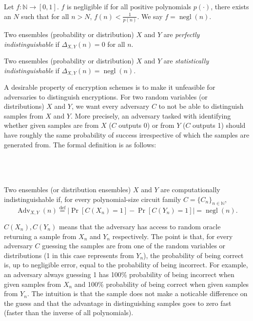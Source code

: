 \begin{definition}
    Let $f \colon \mathbb{N} \to [0,1]$. $f$ is negligible if for all positive polynomials $p(\cdot)$, there exists an $N$ such that for all $n>N$, $f(n) < \frac{1}{p(n)}$. We say $f = \operatorname{negl}(n)$.
\end{definition}
\begin{definition} \label{def:perfectly-indistinguishable}
    Two ensembles (probability or distribution) $X$ and $Y$ are \emph{perfectly indistinguishable} if $\Delta_{X,Y}(n) = 0$ for all $n$.
\end{definition}
\begin{definition} \label{def:statistically-indistinguishable}
    Two ensembles (probability or distribution) $X$ and $Y$ are \emph{statistically indistinguishable} if $\Delta_{X,Y}(n) = \operatorname{negl}(n)$.
\end{definition}
 A desirable property of encryption schemes is to make it unfeasible for adversaries to distinguish encryptions. For two random variables (or distributions) $X$ and $Y$, we want every adversary $C$ to not be able to distinguish samples from $X$ and $Y$. More precisely, an adversary tasked with identifying whether given samples are from $X$ ($C$ outputs 0) or from $Y$ ($C$ outputs 1) should have roughly the same probability of success irrespective of which the samples are generated from. The formal definition is as follows:\\\\\\\\
\begin{definition} \label{def:computationally-indistinguishable}
    Two ensembles (or distribution ensembles) $X$ and $Y$ are computationally indistinguishable if, for every polynomial-size circuit family $C = \{C_n\}_{n \in \mathbb{N}}$, $$\operatorname{Adv}_{X,Y}(n) \stackrel{\mathrm{def}}{=} |\operatorname{Pr}[C(X_n) = 1] - \operatorname{Pr}[C(Y_n) = 1]| = \operatorname{negl}(n).$$
\end{definition}
$C(X_n), C(Y_n)$ means that the adversary has access to random oracle returning a sample from $X_n$ and $Y_n$ respectively. The point is that, for every adversary $C$ guessing the samples are from one of the random variables or distributions (1 in this case represents from $Y_n$), the probability of being correct is, up to negligible error, equal to the probability of being incorrect. For example, an adversary always guessing 1 has 100\% probability of being incorrect when given samples from $X_n$ and 100\% probability of being correct when given samples from $Y_n$. The intuition is that the sample does not make a noticable difference on the guess and that the advantage in distinguishing samples goes to zero fast (faster than the inverse of all polynomials).

